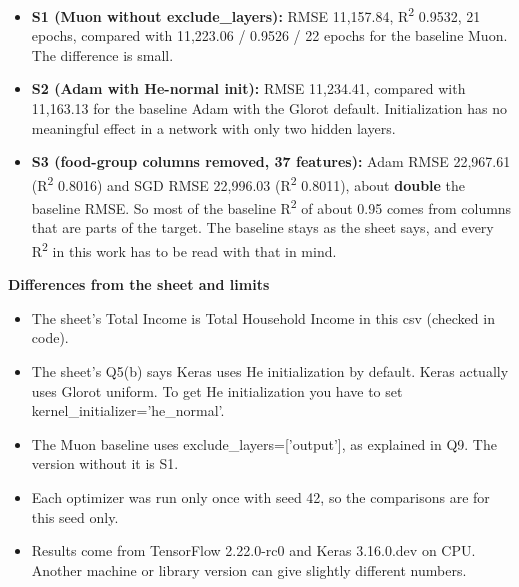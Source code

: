\documentclass[12pt,a4paper]{article}
\providecommand{\tightlist}{\setlength{\itemsep}{0pt}\setlength{\parskip}{0pt}}
\begin{document}
\begin{itemize}
\tightlist
\item
  \textbf{S1 (Muon without exclude\_layers):} RMSE 11,157.84, R\textsuperscript{2} 0.9532, 21 epochs, compared with 11,223.06 / 0.9526 / 22 epochs for the baseline Muon. The difference is small.
\item
  \textbf{S2 (Adam with He-normal init):} RMSE 11,234.41, compared with 11,163.13 for the baseline Adam with the Glorot default. Initialization has no meaningful effect in a network with only two hidden layers.
\item
  \textbf{S3 (food-group columns removed, 37 features):} Adam RMSE 22,967.61 (R\textsuperscript{2} 0.8016) and SGD RMSE 22,996.03 (R\textsuperscript{2} 0.8011), about \textbf{double} the baseline RMSE. So most of the baseline R\textsuperscript{2} of about 0.95 comes from columns that are parts of the target. The baseline stays as the sheet says, and every R\textsuperscript{2} in this work has to be read with that in mind.
\end{itemize}

\textbf{Differences from the sheet and limits}

\begin{itemize}
\tightlist
\item
  The sheet's Total Income is Total Household Income in this csv (checked in code).
\item
  The sheet's Q5(b) says Keras uses He initialization by default. Keras actually uses Glorot uniform. To get He initialization you have to set kernel\_initializer='he\_normal'.
\item
  The Muon baseline uses exclude\_layers=['output'], as explained in Q9. The version without it is S1.
\item
  Each optimizer was run only once with seed 42, so the comparisons are for this seed only.
\item
  Results come from TensorFlow 2.22.0-rc0 and Keras 3.16.0.dev on CPU. Another machine or library version can give slightly different numbers.
\end{itemize}


\clearpage
\end{document}

